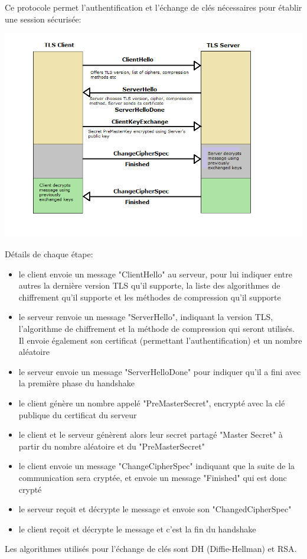 Ce protocole permet l'authentification et l'échange de clés nécessaires pour établir une session sécurisée:
\begin{center}
\includegraphics[scale=0.6]{img/tls-handshake.png}
\end{center}

Détails de chaque étape:
\begin{itemize}
\item le client envoie un message "ClientHello" au serveur, pour lui indiquer entre autres la dernière version TLS qu'il supporte, la liste des algorithmes de chiffrement qu'il supporte et les méthodes de compression qu'il supporte
\item le serveur renvoie un message "ServerHello", indiquant la version TLS, l'algorithme de chiffrement et la méthode de compression qui seront utilisés. Il envoie également son certificat (permettant l'authentification) et un nombre aléatoire
\item le serveur envoie un message "ServerHelloDone" pour indiquer qu'il a fini avec la première phase du handshake
\item le client génère un nombre appelé "PreMasterSecret", encrypté avec la clé publique du certificat du serveur
\item le client et le serveur génèrent alors leur secret partagé "Master Secret" à partir du nombre aléatoire et du "PreMasterSecret"
\item le client envoie un message "ChangeCipherSpec" indiquant que la suite de la communication sera cryptée, et envoie un message "Finished" qui est donc crypté
\item le serveur reçoit et décrypte le message et envoie son "ChangedCipherSpec"
\item le client reçoit et décrypte le message et c'est la fin du handshake
\end{itemize}
Les algorithmes utilisés pour l'échange de clés sont DH (Diffie-Hellman) et RSA.

